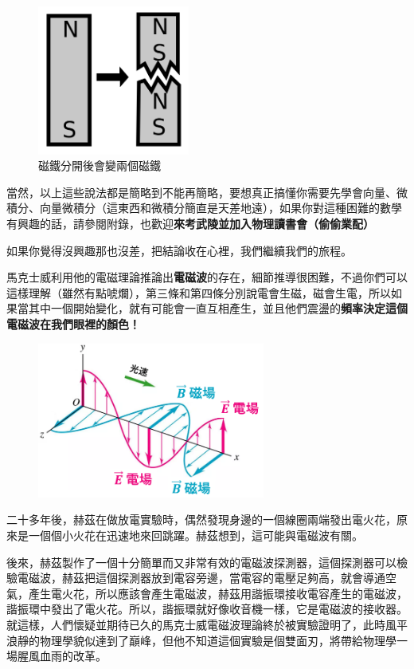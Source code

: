 \begin{figure}[H]
\centering
\graphicspath{{physics/}}
\includegraphics[width=5cm, center]{mag.png}
\caption{磁鐵分開後會變兩個磁鐵}
\label{fig:mag}
\end{figure}

當然，以上這些說法都是簡略到不能再簡略，要想真正搞懂你需要先學會向量、微積分、向量微積分（這東西和微積分簡直是天差地遠），如果你對這種困難的數學有興趣的話，請參閱附錄，也歡迎\textbf{來考武陵並加入物理讀書會（偷偷業配）}

如果你覺得沒興趣那也沒差，把結論收在心裡，我們繼續我們的旅程。

馬克士威利用他的電磁理論推論出\textbf{電磁波}的存在，細節推導很困難，不過你們可以這樣理解（雖然有點唬爛），第三條和第四條分別說電會生磁，磁會生電，所以如果當其中一個開始變化，就有可能會一直互相產生，並且他們震盪的\textbf{頻率決定這個電磁波在我們眼裡的顏色！}
\begin{figure}[H]
\centering
\graphicspath{{physics/}}
\includegraphics[width=7.5cm, center]{mag-wave.png}
\label{fig:mag-wave}
\end{figure}
二十多年後，赫茲在做放電實驗時，偶然發現身邊的一個線圈兩端發出電火花，原來是一個個小火花在迅速地來回跳躍。赫茲想到，這可能與電磁波有關。

後來，赫茲製作了一個十分簡單而又非常有效的電磁波探測器，這個探測器可以檢驗電磁波，赫茲把這個探測器放到電容旁邊，當電容的電壓足夠高，就會導通空氣，產生電火花，所以應該會產生電磁波，赫茲用諧振環接收電容產生的電磁波，諧振環中發出了電火花。所以，諧振環就好像收音機一樣，它是電磁波的接收器。就這樣，人們懷疑並期待已久的馬克士威電磁波理論終於被實驗證明了，此時風平浪靜的物理學貌似達到了巔峰，但他不知道這個實驗是個雙面刃，將帶給物理學一場腥風血雨的改革。

